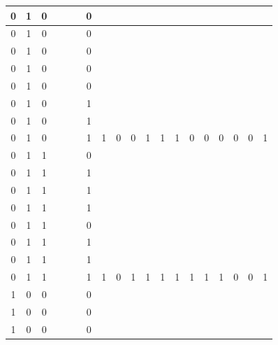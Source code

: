 \begin{table}[!tb]
\begin{tabular}{|c|c|c|c|c|c|c|c|c|c|c|c|c|c|c|c|c|c|c|}
        \rowcolor{red!40} 0 & 1 & 0 &  &  &  & 0 &  &  &  &  &  &  &  &  &  &  &  &  \\ \hline
        \rowcolor{red!40} 0 & 1 & 0 &  &  &  & 0 &  &  &  &  &  &  &  &  &  &  &  &  \\ \hline
        \rowcolor{red!40} 0 & 1 & 0 &  &  &  & 0 &  &  &  &  &  &  &  &  &  &  &  &  \\ \hline
        \rowcolor{red!40} 0 & 1 & 0 &  &  &  & 0 &  &  &  &  &  &  &  &  &  &  &  &  \\ \hline
        \rowcolor{red!40} 0 & 1 & 0 &  &  &  & 0 &  &  &  &  &  &  &  &  &  &  &  &  \\ \hline
        \rowcolor{red!40} 0 & 1 & 0 &  &  &  & 1 &  &  &  &  &  &  &  &  &  &  &  &  \\ \hline
        \rowcolor{red!40} 0 & 1 & 0 &  &  &  & 1 &  &  &  &  &  &  &  &  &  &  &  &  \\ \hline
        \rowcolor{red!40} 0 & 1 & 0 &  &  &  & 1 & 1 & 0 & 0 & 1 & 1 & 1 & 0 & 0 & 0 & 0 & 0 & 1 \\ \hline
        \rowcolor{green!40} 0 & 1 & 1 &  &  &  & 0 &  &  &  &  &  &  &  &  &  &  &  &  \\ \hline
        \rowcolor{green!40} 0 & 1 & 1 &  &  &  & 1 &  &  &  &  &  &  &  &  &  &  &  &  \\ \hline
        \rowcolor{green!40} 0 & 1 & 1 &  &  &  & 1 &  &  &  &  &  &  &  &  &  &  &  &  \\ \hline
        \rowcolor{green!40} 0 & 1 & 1 &  &  &  & 1 &  &  &  &  &  &  &  &  &  &  &  &  \\ \hline
        \rowcolor{green!40} 0 & 1 & 1 &  &  &  & 0 &  &  &  &  &  &  &  &  &  &  &  &  \\ \hline
        \rowcolor{green!40} 0 & 1 & 1 &  &  &  & 1 &  &  &  &  &  &  &  &  &  &  &  &  \\ \hline
        \rowcolor{green!40} 0 & 1 & 1 &  &  &  & 1 &  &  &  &  &  &  &  &  &  &  &  &  \\ \hline
        \rowcolor{green!40} 0 & 1 & 1 &  &  &  & 1 & 1 & 0 & 1 & 1 & 1 & 1 & 1 & 1 & 1 & 0 & 0 & 1 \\ \hline
        \rowcolor{yellow!40} 1 & 0 & 0 &  &  &  & 0 &  &  &  &  &  &  &  &  &  &  &  &  \\ \hline
        \rowcolor{yellow!40} 1 & 0 & 0 &  &  &  & 0 &  &  &  &  &  &  &  &  &  &  &  &  \\ \hline
        \rowcolor{yellow!40} 1 & 0 & 0 &  &  &  & 0 &  &  &  &  &  &  &  &  &  &  &  &  \\ \hline

\end{tabular}
\end{table}
